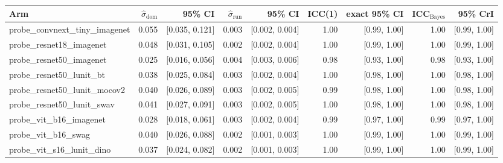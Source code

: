 \begin{tabular}{lrrrrrrrr}
\toprule
Arm & $\hat\sigma_\text{dom}$ & 95\% CI & $\hat\sigma_\text{run}$ & 95\% CI & ICC(1) & exact 95\% CI & ICC$_\text{Bayes}$ & 95\% CrI \\
\midrule
probe\_convnext\_tiny\_imagenet & 0.055 & [0.035, 0.121] & 0.003 & [0.002, 0.004] & 1.00 & [0.99, 1.00] & 1.00 & [0.99, 1.00] \\
probe\_resnet18\_imagenet & 0.048 & [0.031, 0.105] & 0.002 & [0.002, 0.004] & 1.00 & [0.99, 1.00] & 1.00 & [0.99, 1.00] \\
probe\_resnet50\_imagenet & 0.025 & [0.016, 0.056] & 0.004 & [0.003, 0.006] & 0.98 & [0.93, 1.00] & 0.98 & [0.93, 1.00] \\
probe\_resnet50\_lunit\_bt & 0.038 & [0.025, 0.084] & 0.003 & [0.002, 0.004] & 1.00 & [0.98, 1.00] & 1.00 & [0.98, 1.00] \\
probe\_resnet50\_lunit\_mocov2 & 0.040 & [0.026, 0.089] & 0.003 & [0.002, 0.005] & 0.99 & [0.98, 1.00] & 1.00 & [0.98, 1.00] \\
probe\_resnet50\_lunit\_swav & 0.041 & [0.027, 0.091] & 0.003 & [0.002, 0.005] & 1.00 & [0.98, 1.00] & 1.00 & [0.98, 1.00] \\
probe\_vit\_b16\_imagenet & 0.028 & [0.018, 0.061] & 0.003 & [0.002, 0.004] & 0.99 & [0.97, 1.00] & 0.99 & [0.97, 1.00] \\
probe\_vit\_b16\_swag & 0.040 & [0.026, 0.088] & 0.002 & [0.001, 0.003] & 1.00 & [0.99, 1.00] & 1.00 & [0.99, 1.00] \\
probe\_vit\_s16\_lunit\_dino & 0.037 & [0.024, 0.082] & 0.002 & [0.001, 0.003] & 1.00 & [0.99, 1.00] & 1.00 & [0.99, 1.00] \\
\bottomrule
\end{tabular}
